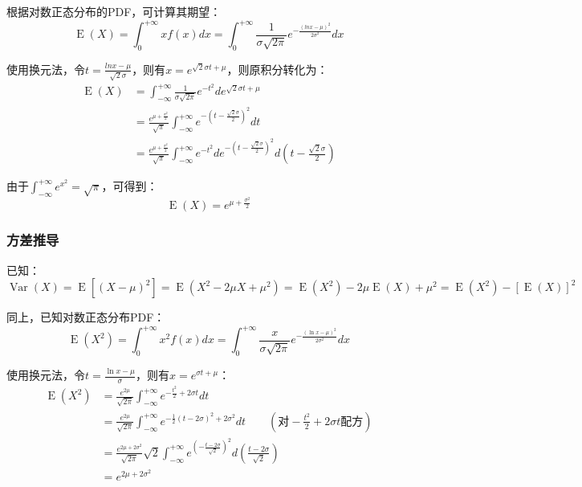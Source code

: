 \documentclass[11pt]{article}
\newcommand{\E}{\operatorname{E}}
\newcommand{\Var}{\operatorname{Var}}
\begin{document}
根据对数正态分布的PDF，可计算其期望：
\begin{equation*}
    \E(X) = \int^{+\infty}_0 x f(x) dx = \int^{+\infty}_0 \frac{1}{\sigma\sqrt{2\pi}} e^{-\frac{(ln x - \mu)^2}{2\sigma^2}} dx
\end{equation*}

使用换元法，令$t = \frac{ln x - \mu}{\sqrt{2}\sigma}$，则有$x = e^{\sqrt{2}\sigma t + \mu}$，则原积分转化为：
\begin{align*}
    \E(X) &= \int^{+\infty}_{-\infty} \frac{1}{\sigma\sqrt{2\pi}}e^{-t^2}d e^{\sqrt{2}\sigma t + \mu}\\ 
    &= \frac{e^{\mu + \frac{\sigma^2}{2}}}{\sqrt{\pi}} \int^{+\infty}_{-\infty} e^{-(t-\frac{\sqrt{2}\sigma}{2})^2} dt\\ 
    &= \frac{e^{\mu + \frac{\sigma^2}{2}}}{\sqrt{\pi}} \int^{+\infty}_{-\infty} e^{-t^2}d e^{-(t-\frac{\sqrt{2}\sigma}{2})^2} d(t-\frac{\sqrt{2}\sigma}{2})
\end{align*}

由于$\int^{+\infty}_{-\infty} e^{x^2} = \sqrt{\pi}$，可得到：
\begin{equation*}
    \E(X) = e^{\mu+\frac{\sigma^2}{2}}
\end{equation*}

\subsubsection{方差推导}

已知：
\begin{equation*}
    \Var(X) = \E[(X-\mu)^2] = \E(X^2 -2\mu X + \mu^2) = \E(X^2) -2\mu \E(X) + \mu^{2} = \E(X^2) - [\E(X)]^2
\end{equation*}

同上，已知对数正态分布PDF：
\begin{equation*}
    \E(X^2) = \int^{+\infty}_0 x^2 f(x) dx = \int^{+\infty}_0 \frac{x}{\sigma\sqrt{2\pi}} e^{-\frac{(\ln x - \mu)^2}{2\sigma^2}} dx
\end{equation*}

使用换元法，令$t = \frac{\ln x-\mu}{\sigma}$，则有$x = e^{\sigma t + \mu}$：
\begin{align*}
    \E(X^2) &= \frac{e^{2\mu}}{\sqrt{2\pi}} \int^{+\infty }_{-\infty } e^{-\frac{t^2}{2}+2\sigma t}dt \\
    &= \frac{e^{2\mu}}{\sqrt{2\pi}} \int^{+\infty }_{-\infty } e^{-\frac{1}{2}(t-2\sigma)^2 + 2\sigma^2}dt \qquad 
    \left(\text{对}-\frac{t^2}{2}+2 \sigma t \text{配方}\right) \\
    &= \frac{e^{2\mu+2\sigma^2}}{\sqrt{2\pi}} \sqrt{2} \int^{+\infty}_{-\infty} e^{(-\frac{t-2\sigma}{\sqrt{2}})^2} d\left(\frac{t-2\sigma}{\sqrt{2}}\right)\\
    &= e^{2\mu +2\sigma^2}
\end{align*}
\end{document}
